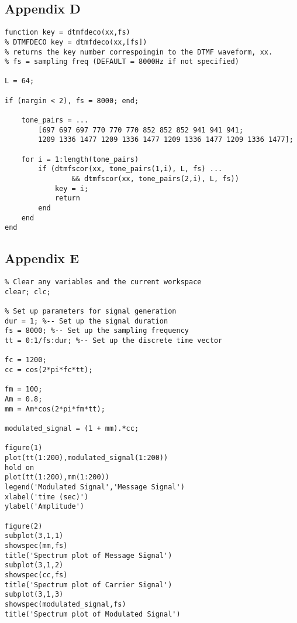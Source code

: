 \documentclass{article}
\begin{document}
\hspace{1cm}

\subsection{Appendix D}

\begin{lstlisting}
function key = dtmfdeco(xx,fs)
% DTMFDECO key = dtmfdeco(xx,[fs])
% returns the key number correspoingin to the DTMF waveform, xx.
% fs = sampling freq (DEFAULT = 8000Hz if not specified)

L = 64;

if (nargin < 2), fs = 8000; end;

	tone_pairs = ...
		[697 697 697 770 770 770 852 852 852 941 941 941;
		1209 1336 1477 1209 1336 1477 1209 1336 1477 1209 1336 1477];

	for i = 1:length(tone_pairs)
		if (dtmfscor(xx, tone_pairs(1,i), L, fs) ...
				&& dtmfscor(xx, tone_pairs(2,i), L, fs))
			key = i;
			return
		end
	end
end
\end{lstlisting}

\newpage

\subsection{Appendix E}

\begin{lstlisting}
% Clear any variables and the current workspace
clear; clc;

% Set up parameters for signal generation
dur = 1; %-- Set up the signal duration
fs = 8000; %-- Set up the sampling frequency
tt = 0:1/fs:dur; %-- Set up the discrete time vector

fc = 1200;
cc = cos(2*pi*fc*tt);

fm = 100;
Am = 0.8;
mm = Am*cos(2*pi*fm*tt);

modulated_signal = (1 + mm).*cc;

figure(1)
plot(tt(1:200),modulated_signal(1:200))
hold on
plot(tt(1:200),mm(1:200))
legend('Modulated Signal','Message Signal')
xlabel('time (sec)')
ylabel('Amplitude')

figure(2)
subplot(3,1,1)
showspec(mm,fs)
title('Spectrum plot of Message Signal')
subplot(3,1,2)
showspec(cc,fs)
title('Spectrum plot of Carrier Signal')
subplot(3,1,3)
showspec(modulated_signal,fs)
title('Spectrum plot of Modulated Signal')
\end{lstlisting}
\end{document}
